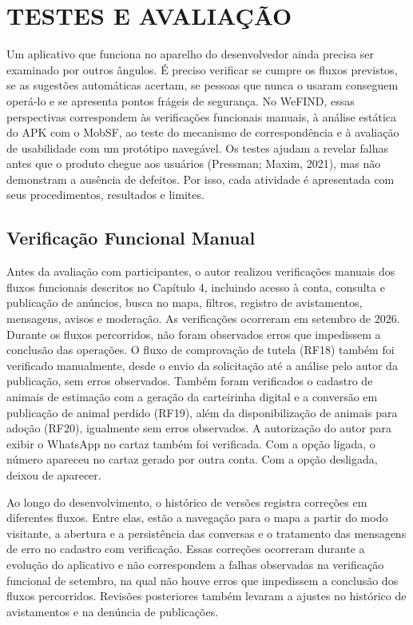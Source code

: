 \section{TESTES E AVALIAÇÃO}
\setcounter{quadro}{4}

Um aplicativo que funciona no aparelho do desenvolvedor ainda precisa ser examinado por outros ângulos. É preciso verificar se cumpre os fluxos previstos, se as sugestões automáticas acertam, se pessoas que nunca o usaram conseguem operá-lo e se apresenta pontos frágeis de segurança. No WeFIND, essas perspectivas correspondem às verificações funcionais manuais, à análise estática do APK com o MobSF, ao teste do mecanismo de correspondência e à avaliação de usabilidade com um protótipo navegável. Os testes ajudam a revelar falhas antes que o produto chegue aos usuários (Pressman; Maxim, 2021), mas não demonstram a ausência de defeitos. Por isso, cada atividade é apresentada com seus procedimentos, resultados e limites.

\subsection{Verificação Funcional Manual}

Antes da avaliação com participantes, o autor realizou verificações manuais dos fluxos funcionais descritos no Capítulo 4, incluindo acesso à conta, consulta e publicação de anúncios, busca no mapa, filtros, registro de avistamentos, mensagens, avisos e moderação. As verificações ocorreram em setembro de 2026. Durante os fluxos percorridos, não foram observados erros que impedissem a conclusão das operações. O fluxo de comprovação de tutela (RF18) também foi verificado manualmente, desde o envio da solicitação até a análise pelo autor da publicação, sem erros observados. Também foram verificados o cadastro de animais de estimação com a geração da carteirinha digital e a conversão em publicação de animal perdido (RF19), além da disponibilização de animais para adoção (RF20), igualmente sem erros observados. A autorização do autor para exibir o WhatsApp no cartaz também foi verificada. Com a opção ligada, o número apareceu no cartaz gerado por outra conta. Com a opção desligada, deixou de aparecer.

Ao longo do desenvolvimento, o histórico de versões registra correções em diferentes fluxos. Entre elas, estão a navegação para o mapa a partir do modo visitante, a abertura e a persistência das conversas e o tratamento das mensagens de erro no cadastro com verificação. Essas correções ocorreram durante a evolução do aplicativo e não correspondem a falhas observadas na verificação funcional de setembro, na qual não houve erros que impedissem a conclusão dos fluxos percorridos. Revisões posteriores também levaram a ajustes no histórico de avistamentos e na denúncia de publicações.

